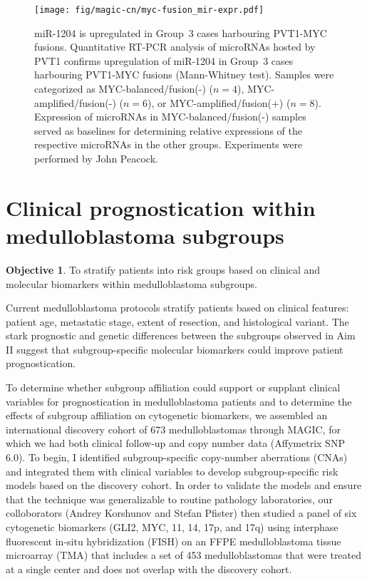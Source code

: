 \documentclass[11pt,letterpaper]{article}
\theoremstyle{definition}
\newtheorem*{objective}{Objective}
\begin{document}
\begin{figure}[h]
	\begin{center}
		\texttt{[image: fig/magic-cn/myc-fusion\_mir-expr.pdf]}
	\end{center}
	\caption[miR-1204 is upregulated in Group~3 cases harbouring PVT1-MYC fusions]
	{
	miR-1204 is upregulated in Group~3 cases harbouring PVT1-MYC fusions.
	Quantitative RT-PCR analysis of microRNAs hosted by PVT1 confirms upregulation of miR-1204 in Group~3 cases harbouring PVT1-MYC fusions (Mann-Whitney test). Samples were categorized as MYC-balanced/fusion(-) ($n = 4$), MYC-amplified/fusion(-) ($n = 6$), or MYC-amplified/fusion(+) ($n = 8$). Expression of microRNAs in MYC-balanced/fusion(-) samples served as baselines for determining relative expressions of the respective microRNAs in the other groups. Experiments were performed by John Peacock.
	}
	\label{fig:myc-fusion_mir-expr}
\end{figure}

\clearpage

\section{Clinical prognostication within medulloblastoma subgroups}

\begin{objective}
To stratify patients into risk groups based on clinical and molecular biomarkers within medulloblastoma subgroups.
\end{objective}

Current medulloblastoma protocols stratify patients based on clinical features: patient age, metastatic stage, extent of resection, and histological variant. The stark prognostic and genetic differences between the subgroups observed in Aim II suggest that subgroup-specific molecular biomarkers could improve patient prognostication.

To determine whether subgroup affiliation could support or supplant clinical variables for prognostication in medulloblastoma patients and to determine the effects of subgroup affiliation on cytogenetic biomarkers, we assembled an international discovery cohort of 673 medulloblastomas through MAGIC, for which we had both clinical follow-up and copy number data (Affymetrix SNP 6.0). To begin, I identified subgroup-specific copy-number aberrations (CNAs) and integrated them with clinical variables to develop subgroup-specific risk models based on the discovery cohort. In order to validate the models and ensure that the technique was generalizable to routine pathology laboratories, our colloborators (Andrey Korshunov and Stefan Pfister) then studied a panel of six cytogenetic biomarkers (GLI2, MYC, 11, 14, 17p, and 17q) using interphase fluorescent in-situ hybridization (FISH) on an FFPE medulloblastoma tissue microarray (TMA) that includes a set of 453 medulloblastomas that were treated at a single center and does not overlap with the discovery cohort.
\end{document}
